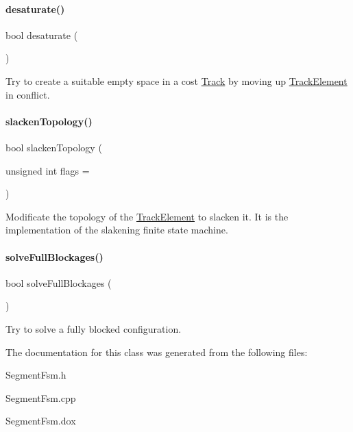 \paragraph{\texorpdfstring{desaturate()}{desaturate()}}
{\footnotesize\ttfamily bool desaturate (\begin{DoxyParamCaption}{ }\end{DoxyParamCaption})}

Try to create a suitable empty space in a cost \mbox{\hyperlink{classKite_1_1Track}{Track}} by moving up \mbox{\hyperlink{classKite_1_1TrackElement}{Track\+Element}} in conflict. \mbox{\label{classKite_1_1SegmentFsm_a623d68f599c0de60cdd36af3f183e6f1}} 
\paragraph{\texorpdfstring{slacken\+Topology()}{slackenTopology()}}
{\footnotesize\ttfamily bool slacken\+Topology (\begin{DoxyParamCaption}\item[{unsigned int}]{flags = {} }\end{DoxyParamCaption})}

Modificate the topology of the \mbox{\hyperlink{classKite_1_1TrackElement}{Track\+Element}} to slacken it. It is the implementation of the slakening finite state machine. \mbox{\label{classKite_1_1SegmentFsm_ab8ae818baad1d0a274a7e8c308ca3f92}} 
\paragraph{\texorpdfstring{solve\+Full\+Blockages()}{solveFullBlockages()}}
{\footnotesize\ttfamily bool solve\+Full\+Blockages (\begin{DoxyParamCaption}{ }\end{DoxyParamCaption})}

Try to solve a fully blocked configuration. 

The documentation for this class was generated from the following files\+:\begin{DoxyCompactItemize}
\item 
Segment\+Fsm.\+h\item 
Segment\+Fsm.\+cpp\item 
Segment\+Fsm.\+dox\end{DoxyCompactItemize}
